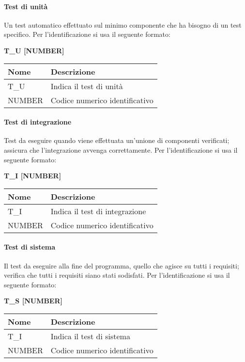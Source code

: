 \paragraph{Test di unità} \hfill \break
Un test automatico effettuato sul minimo componente che ha bisogno di un test specifico.\newline
Per l’identificazione si usa il seguente formato:
\begin{center}
    \textbf{T\_U [NUMBER]}
\end{center}
\renewcommand{\arraystretch}{1.8} 
 \begin{tabular}{ |m{7em}|m{30em}| }
        \hline 
        \textbf{Nome} & \textbf{Descrizione} \\
        \hline
            T\_U & Indica il test di unità \\
        \hline
            NUMBER & Codice numerico identificativo \\
        \hline
 \end{tabular}

\paragraph{Test di integrazione}  \hfill \break
Test da eseguire quando viene effettuata un'unione di componenti verificati; assicura che l’integrazione 
avvenga correttamente.
Per l’identificazione si usa il seguente formato:
\begin{center}
    \textbf{T\_I [NUMBER]}
\end{center}
\renewcommand{\arraystretch}{1.8} 
 \begin{tabular}{ |m{7em}|m{30em}| }
        \hline
        \textbf{Nome} & \textbf{Descrizione} \\
        \hline
            T\_I & Indica il test di integrazione \\
        \hline
            NUMBER & Codice numerico identificativo \\
        \hline
 \end{tabular}

\paragraph{Test di sistema}  \hfill \break
Il test da eseguire alla fine del programma, quello che agisce su tutti i requisiti; verifica che tutti i 
requisiti siano stati sodisfati.
Per l’identificazione si usa il seguente formato:
\begin{center}
    \textbf{T\_S [NUMBER]}
\end{center}
\renewcommand{\arraystretch}{1.8} 
 \begin{tabular}{ |m{7em}|m{30em}| }
        \hline
        \textbf{Nome} & \textbf{Descrizione} \\
        \hline
            T\_I & Indica il test di sistema \\
        \hline
            NUMBER & Codice numerico identificativo \\
        \hline
 \end{tabular}

